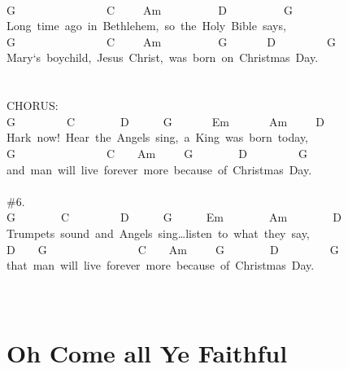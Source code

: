 \documentclass[]{book}
\let\stdsection\section
\renewcommand\section{\clearpage\stdsection}
\begin{document}
~\\
G~~~~~~~~~~~~~~~~C~~~~~Am~~~~~~~~~~D~~~~~~~~~~G~\\
Long~time~ago~in~Bethlehem,~so~the~Holy~Bible~says,~~\\
G~~~~~~~~~~~~~~~~C~~~~~Am~~~~~~~~~~G~~~~~~~D~~~~~~~~~G~\\
Mary`s~boychild,~Jesus~Christ,~was~born~on~Christmas~Day.~\\
~\\
\hspace*{0.333em}\hspace*{0.333em}\\
CHORUS:\\
G~~~~~~~~~C~~~~~~~~D~~~~~~G~~~~~~~Em~~~~~~~Am~~~~~D~\\
Hark~now!~Hear~the~Angels~sing,~a~King~was~born~today,~\\
\hspace*{0.333em}\hspace*{0.333em}\hspace*{0.333em}\hspace*{0.333em}G~~~~~~~~~~~~~~~~C~~~~Am~~~~~G~~~~~~~~D~~~~~~~~~G~\\
and~man~will~live~forever~more~because~of~Christmas~Day.\\
~\\
\#6.~\\
G~~~~~~~~C~~~~~~~~~D~~~~~~G~~~~~~Em~~~~~~~~Am~~~~~~~~D~\\
Trumpets~sound~and~Angels~sing\ldots listen~to~what~they~say,~\\
D~~~~G~~~~~~~~~~~~~~~~C~~~~Am~~~~~G~~~~~~~~D~~~~~~~~~G~\\
that~man~will~live~forever~more~because~of~Christmas~Day.\\
~\\
~\\

\hypertarget{oh-come-all-ye-faithful}{%
\section{Oh Come all Ye Faithful}\label{oh-come-all-ye-faithful}}
\end{document}
